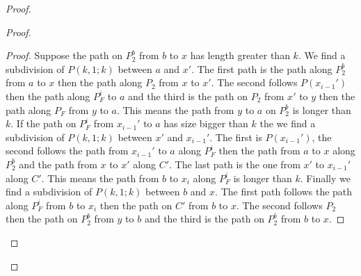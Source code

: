 \documentclass[10pt]{article}
\theoremstyle{plain}
\theoremstyle{definition}
\theoremstyle{remark}
\begin{document}
\begin{proof}
\begin{proof}
\begin{proof}
Suppose the path on $P_2^b$ from $b$ to $x$ has length greater than $k$. We find a subdivision of $P(k,1;k)$ between $a$ and $x'$.
The first path is the path along $P_2^b$ from $a$ to $x$ then the path along $P_2$ from $x$ to $x'$. The second follows $P(x_{i-1}')$
then the path along $P_F^i$ to $a$ and the third is the path on $P_2$ from $x'$ to $y$ then the path along $P_F$ from $y$ to $a$. 
This means the path from $y$ to 
$a$ on $P_2^b$ is longer than $k$. If the path on $P_F^i$ from  $x_{i-1}'$ to $a$ has size bigger than $k$ the we find a subdivision 
of $P(k,1;k)$ between $x'$ and $x_{i-1}'$. The first is $P(x_{i-1}')$, the second follows the path from $x_{i-1}'$ to $a$ along $P_F^i$ then 
the path from $a$ to $x$ along $P_2^b$ and the path from $x$ to $x'$ along $C'$. The last path is the one from $x'$ to $x_{i-1}'$ along
$C'$. This means the path from $b$ to $x_i$ along $P_F^i$ is longer than $k$. Finally we find a subdivision of $P(k,1;k)$ between $b$ 
and $x$. The first path follows the path along $P_F^i$ from $b$ to $x_i$ then the path on $C'$ from $b$ to $x$. The second follows $P_2$ then
the path on $P_2^b$ from $y$ to $b$ and the third is the path on $P_2^b$ from $b$ to $x$.

\end{proof}




\end{proof}
\end{proof}
\end{document}
